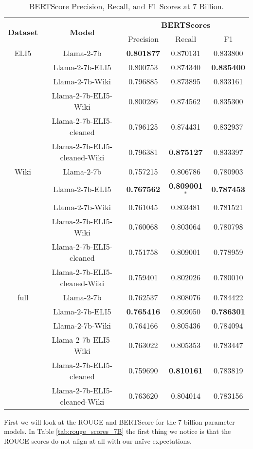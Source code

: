 \documentclass[11pt, oneside]{article}   	%
\begin{document}
\begin{table}[h!]
\centering
\begin{tabular}{ccccc}
\hline
\multirow{2}{*}{\textbf{Dataset}} & \multirow{2}{*}{\textbf{Model}} & \multicolumn{3}{c}{\textbf{BERTScores}} \\
& & Precision & Recall & F1 \\
\hline
ELI5 & Llama-2-7b & \textbf{0.801877} & 0.870131 & 0.833800 \\
 & Llama-2-7b-ELI5 & 0.800753 & 0.874340 & \textbf{0.835400} \\
 & Llama-2-7b-Wiki & 0.796885 & 0.873895 & 0.833161 \\
 & Llama-2-7b-ELI5-Wiki & 0.800286 & 0.874562 & 0.835300 \\
  & Llama-2-7b-ELI5-cleaned & 0.796125 & 0.874431 & 0.832937 \\
 & Llama-2-7b-ELI5-cleaned-Wiki & 0.796381 & \textbf{0.875127} & 0.833397 \\
\hline
Wiki & Llama-2-7b & 0.757215 & 0.806786 & 0.780903 \\
 & Llama-2-7b-ELI5 & \textbf{0.767562} & \textbf{0.809001}$^{*}$ & \textbf{0.787453} \\
 & Llama-2-7b-Wiki & 0.761045 & 0.803481 & 0.781521 \\
 & Llama-2-7b-ELI5-Wiki & 0.760068 & 0.803064 & 0.780798 \\
  & Llama-2-7b-ELI5-cleaned & 0.751758 & 0.809001 & 0.778959 \\
 & Llama-2-7b-ELI5-cleaned-Wiki & 0.759401 & 0.802026 & 0.780010 \\
 \hline
full & Llama-2-7b & 0.762537 & 0.808076 & 0.784422 \\
 & Llama-2-7b-ELI5 & \textbf{0.765416} & 0.809050 & \textbf{0.786301} \\
 & Llama-2-7b-Wiki & 0.764166 & 0.805436 & 0.784094 \\
 & Llama-2-7b-ELI5-Wiki & 0.763022 & 0.805353 & 0.783447 \\
  & Llama-2-7b-ELI5-cleaned & 0.759690 & \textbf{0.810161} & 0.783819 \\
 & Llama-2-7b-ELI5-cleaned-Wiki & 0.763620 & 0.804014 & 0.783156 \\
\hline
\end{tabular}
\caption{BERTScore Precision, Recall, and F1 Scores at 7 Billion.}
\label{tab:bertscores_7b}
\end{table}
First we will look at the ROUGE and BERTScore for the 7 billion parameter models.
In Table \ref{tab:rouge_scores_7B} the first thing we notice is that the ROUGE scores do not align at all with our na\"ive expectations.
\end{document}
